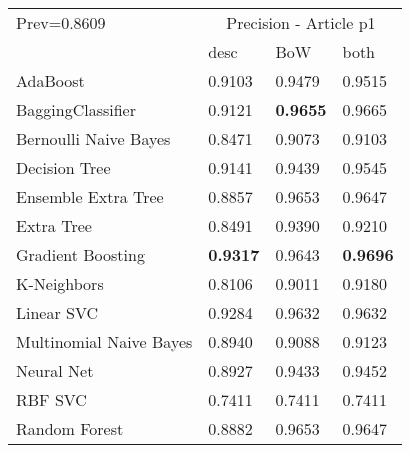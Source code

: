 \begin{tabular}{|l|l|l|l| }
\hline
Prev=0.8609 &  \multicolumn{3}{c|}{Precision - Article p1} \\
\cline{2-4} & desc & BoW & both \\ \hline
AdaBoost                & 0.9103 & 0.9479 & 0.9515\\
BaggingClassifier       & 0.9121 & {\bf 0.9655} & 0.9665\\
Bernoulli Naive Bayes   & 0.8471 & 0.9073 & 0.9103\\
Decision Tree           & 0.9141 & 0.9439 & 0.9545\\
Ensemble Extra Tree     & 0.8857 & 0.9653 & 0.9647\\
Extra Tree              & 0.8491 & 0.9390 & 0.9210\\
Gradient Boosting       & {\bf 0.9317} & 0.9643 & {\bf 0.9696}\\
K-Neighbors             & 0.8106 & 0.9011 & 0.9180\\
Linear SVC              & 0.9284 & 0.9632 & 0.9632\\
Multinomial Naive Bayes & 0.8940 & 0.9088 & 0.9123\\
Neural Net              & 0.8927 & 0.9433 & 0.9452\\
RBF SVC                 & 0.7411 & 0.7411 & 0.7411\\
Random Forest           & 0.8882 & 0.9653 & 0.9647\\
\hline
\end{tabular}